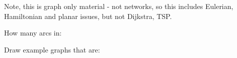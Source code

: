 \documentclass[a4paper,10pt]{exam}
\title{\papertitle}
\date{February}
\begin{document}
\maketitle

Note, this is graph only material - not networks, so this includes Eulerian, Hamiltonian and planar issues, but not Dijkstra, TSP. 

\begin{questions}
    \question How many arcs in: 
    \question Draw example graphs that are:
\end{questions}
\end{document}
